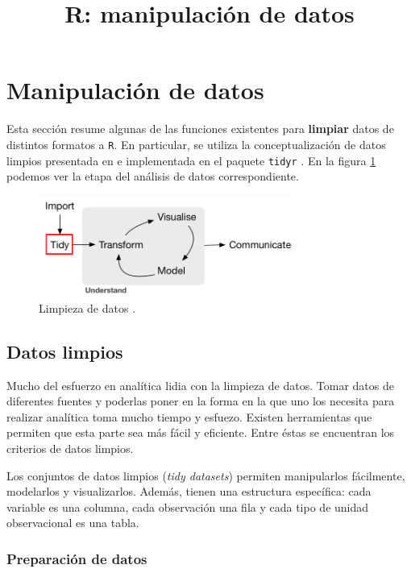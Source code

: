 \documentclass[]{article}
\title{R: manipulación de datos}
\author{}
\date{}
\begin{document}
\section{Manipulación de datos}\label{manipulacion-de-datos}

Esta sección resume algunas de las funciones existentes para
\textbf{limpiar} datos de distintos formatos a \texttt{R}. En
particular, se utiliza la conceptualización de datos limpios presentada
en \textcite{wickham2014tidy} e implementada en el paquete
\texttt{tidyr} \parencite{tidyr}. En la figura \ref{fig:ciclo2} podemos
ver la etapa del análisis de datos correspondiente.

\begin{figure}[h]
    \centering
    \includegraphics[width=0.75\textwidth]{../img/02_ciclo_2.png}
    \caption{Limpieza de datos \textcite[Introducción]{grolemund2016r}.}
    \label{fig:ciclo2}
\end{figure}

\subsection{Datos limpios}\label{datos-limpios}

Mucho del esfuerzo en analítica lidia con la limpieza de datos. Tomar
datos de diferentes fuentes y poderlas poner en la forma en la que uno
los necesita para realizar analítica toma mucho tiempo y esfuezo.
Existen herramientas que permiten que esta parte sea más fácil y
eficiente. Entre éstas se encuentran los criterios de datos limpios.

Los conjuntos de datos limpios (\emph{tidy datasets}) permiten
manipularlos fácilmente, modelarlos y visualizarlos. Además, tienen una
estructura específica: cada variable es una columna, cada observación
una fila y cada tipo de unidad observacional es una tabla.

\subsubsection{Preparación de datos}\label{preparacion-de-datos}
\end{document}
